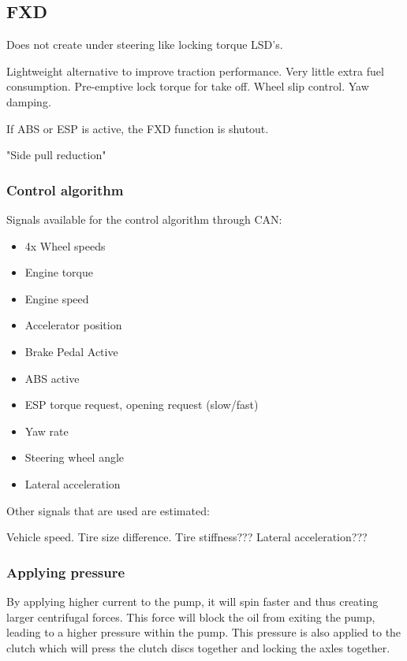 \subsection{FXD}

Does not create under steering like locking torque LSD's. 

Lightweight alternative  to improve traction performance. Very little extra fuel consumption. Pre-emptive lock torque for take off. Wheel slip control. Yaw damping. 

If ABS or ESP is active, the FXD function is shutout. 

"Side pull reduction"


\subsubsection{Control algorithm}

Signals available for the control algorithm through CAN:
\begin{itemize}
	\item 4x Wheel speeds
	\item Engine torque
	\item Engine speed
	\item Accelerator position
	\item Brake Pedal Active
	\item ABS active
	\item ESP torque request, opening request (slow/fast)
	\item Yaw rate
	\item Steering wheel angle
	\item Lateral acceleration
\end{itemize}

Other signals that are used are estimated:

Vehicle speed.
Tire size difference.
Tire stiffness???
Lateral acceleration???



\subsubsection{Applying pressure}

By applying higher current to the pump, it will spin faster and thus creating larger centrifugal forces. This force will block the oil from exiting the pump, leading to a higher pressure within the pump. This pressure is also applied to the clutch which will press the clutch discs together and locking the axles together.

